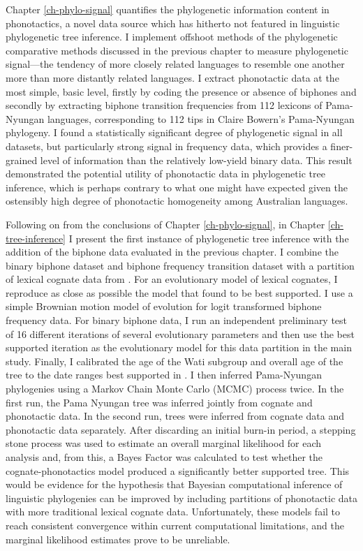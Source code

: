 Chapter \ref{ch-phylo-signal} quantifies the phylogenetic information content in phonotactics, a novel data source which has hitherto not featured in linguistic phylogenetic tree inference. I implement offshoot methods of the phylogenetic comparative methods discussed in the previous chapter to measure phylogenetic signal---the tendency of more closely related languages to resemble one another more than more distantly related languages. I extract phonotactic data at the most simple, basic level, firstly by coding the presence or absence of biphones and secondly by extracting biphone transition frequencies from 112 lexicons of Pama-Nyungan languages, corresponding to 112 tips in Claire Bowern's Pama-Nyungan phylogeny. I found a statistically significant degree of phylogenetic signal in all datasets, but particularly strong signal in frequency data, which provides a finer-grained level of information than the relatively low-yield binary data. This result demonstrated the potential utility of phonotactic data in phylogenetic tree inference, which is perhaps contrary to what one might have expected given the ostensibly high degree of phonotactic homogeneity among Australian languages.

Following on from the conclusions of Chapter \ref{ch-phylo-signal}, in Chapter \ref{ch-tree-inference} I present the first instance of phylogenetic tree inference with the addition of the biphone data evaluated in the previous chapter. I combine the binary biphone dataset and biphone frequency transition dataset with a partition of lexical cognate data from \textcite{bouckaert_origin_2018}. For an evolutionary model of lexical cognates, I reproduce as close as possible the model that \textcite{bouckaert_origin_2018} found to be best supported. I use a simple Brownian motion model of evolution for logit transformed biphone frequency data. For binary biphone data, I run an independent preliminary test of 16 different iterations of several evolutionary parameters and then use the best supported iteration as the evolutionary model for this data partition in the main study. Finally, I calibrated the age of the Wati subgroup and overall age of the tree to the date ranges best supported in \textcite{bouckaert_origin_2018}. I then inferred Pama-Nyungan phylogenies using a Markov Chain Monte Carlo (MCMC) process twice. In the first run, the Pama Nyungan tree was inferred jointly from cognate and phonotactic data. In the second run, trees were inferred from cognate data and phonotactic data separately. After discarding an initial burn-in period, a stepping stone process \autocite{baele_accurate_2013} was used to estimate an overall marginal likelihood for each analysis and, from this, a Bayes Factor was calculated to test whether the cognate-phonotactics model produced a significantly better supported tree. This would be evidence for the hypothesis that Bayesian computational inference of linguistic phylogenies can be improved by including partitions of phonotactic data with more traditional lexical cognate data. Unfortunately, these models fail to reach consistent convergence within current computational limitations, and the marginal likelihood estimates prove to be unreliable.

